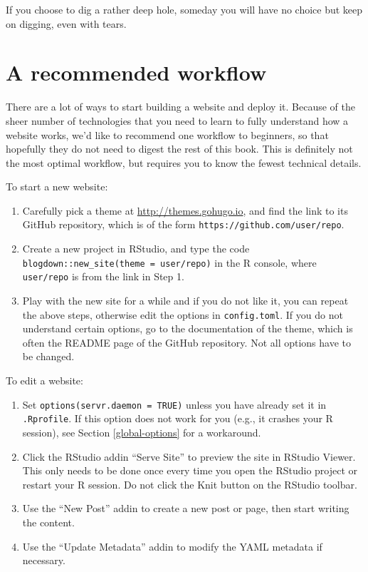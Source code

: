 \documentclass[12pt,]{krantz}
\renewenvironment{quote}{\begin{VF}}{\end{VF}}
\theoremstyle{definition}
\theoremstyle{definition}
\theoremstyle{definition}
\theoremstyle{remark}
\begin{document}
\begin{quote}
If you choose to dig a rather deep hole, someday you will have no choice
but keep on digging, even with tears.

\end{quote}

\section{A recommended workflow}\label{workflow}

There are a lot of ways to start building a website and deploy it.
Because of the sheer number of technologies that you need to learn to
fully understand how a website works, we'd like to recommend one
workflow to beginners, so that hopefully they do not need to digest the
rest of this book. This is definitely not the most optimal workflow, but
requires you to know the fewest technical details.

To start a new website:

\begin{enumerate}
\def\labelenumi{\arabic{enumi}.}
\item
  Carefully pick a theme at \url{http://themes.gohugo.io}, and find the
  link to its GitHub repository, which is of the form
  \texttt{https://github.com/user/repo}.
\item
  Create a new project in RStudio, and type the code
  \texttt{blogdown::new\_site(theme\ =\ \textquotesingle{}user/repo\textquotesingle{})}
  in the R console, where \texttt{user/repo} is from the link in Step 1.
\item
  Play with the new site for a while and if you do not like it, you can
  repeat the above steps, otherwise edit the options in
  \texttt{config.toml}. If you do not understand certain options, go to
  the documentation of the theme, which is often the README page of the
  GitHub repository. Not all options have to be changed.
\end{enumerate}

To edit a website:

\begin{enumerate}
\def\labelenumi{\arabic{enumi}.}
\item
  Set \texttt{options(servr.daemon\ =\ TRUE)} unless you have already
  set it in \texttt{.Rprofile}. If this option does not work for you
  (e.g., it crashes your R session), see Section \ref{global-options}
  for a workaround.
\item
  Click the RStudio addin ``Serve Site'' to preview the site in RStudio
  Viewer. This only needs to be done once every time you open the
  RStudio project or restart your R session. Do not click the Knit
  button on the RStudio toolbar.
\item
  Use the ``New Post'' addin to create a new post or page, then start
  writing the content.
\item
  Use the ``Update Metadata'' addin to modify the YAML metadata if
  necessary.
\end{enumerate}
\end{document}
